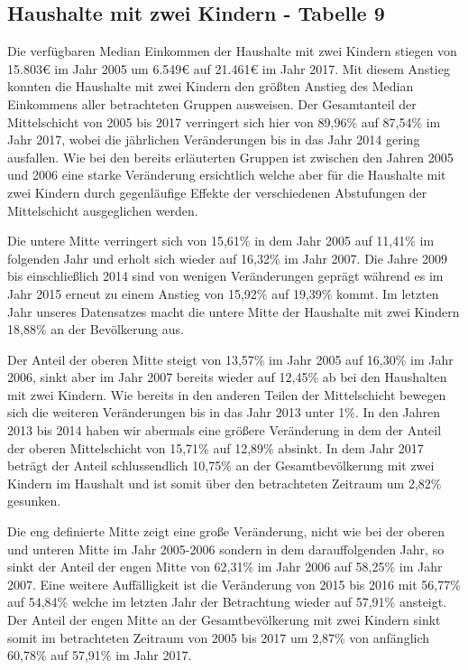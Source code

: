 \documentclass[12pt,]{article}
\newcommand{\euro}{€}
\begin{document}
\subsection{Haushalte mit zwei Kindern - Tabelle
9}\label{haushalte-mit-zwei-kindern---tabelle-9}

Die verfügbaren Median Einkommen der Haushalte mit zwei Kindern stiegen
von 15.803\euro{} im Jahr 2005 um 6.549\euro{} auf 21.461\euro{} im Jahr
2017. Mit diesem Anstieg konnten die Haushalte mit zwei Kindern den
größten Anstieg des Median Einkommens aller betrachteten Gruppen
ausweisen. Der Gesamtanteil der Mittelschicht von 2005 bis 2017
verringert sich hier von 89,96\% auf 87,54\% im Jahr 2017, wobei die
jährlichen Veränderungen bis in das Jahr 2014 gering ausfallen. Wie bei
den bereits erläuterten Gruppen ist zwischen den Jahren 2005 und 2006
eine starke Veränderung ersichtlich welche aber für die Haushalte mit
zwei Kindern durch gegenläufige Effekte der verschiedenen Abstufungen
der Mittelschicht ausgeglichen werden.

Die untere Mitte verringert sich von 15,61\% in dem Jahr 2005 auf
11,41\% im folgenden Jahr und erholt sich wieder auf 16,32\% im Jahr
2007. Die Jahre 2009 bis einschließlich 2014 sind von wenigen
Veränderungen geprägt während es im Jahr 2015 erneut zu einem Anstieg
von 15,92\% auf 19,39\% kommt. Im letzten Jahr unseres Datensatzes macht
die untere Mitte der Haushalte mit zwei Kindern 18,88\% an der
Bevölkerung aus.

Der Anteil der oberen Mitte steigt von 13,57\% im Jahr 2005 auf 16,30\%
im Jahr 2006, sinkt aber im Jahr 2007 bereits wieder auf 12,45\% ab bei
den Haushalten mit zwei Kindern. Wie bereits in den anderen Teilen der
Mittelschicht bewegen sich die weiteren Veränderungen bis in das Jahr
2013 unter 1\%. In den Jahren 2013 bis 2014 haben wir abermals eine
größere Veränderung in dem der Anteil der oberen Mittelschicht von
15,71\% auf 12,89\% absinkt. In dem Jahr 2017 beträgt der Anteil
schlussendlich 10,75\% an der Gesamtbevölkerung mit zwei Kindern im
Haushalt und ist somit über den betrachteten Zeitraum um 2,82\%
gesunken.

Die eng definierte Mitte zeigt eine große Veränderung, nicht wie bei der
oberen und unteren Mitte im Jahr 2005-2006 sondern in dem
darauffolgenden Jahr, so sinkt der Anteil der engen Mitte von 62,31\% im
Jahr 2006 auf 58,25\% im Jahr 2007. Eine weitere Auffälligkeit ist die
Veränderung von 2015 bis 2016 mit 56,77\% auf 54,84\% welche im letzten
Jahr der Betrachtung wieder auf 57,91\% ansteigt. Der Anteil der engen
Mitte an der Gesamtbevölkerung mit zwei Kindern sinkt somit im
betrachteten Zeitraum von 2005 bis 2017 um 2,87\% von anfänglich 60,78\%
auf 57,91\% im Jahr 2017.
\end{document}
